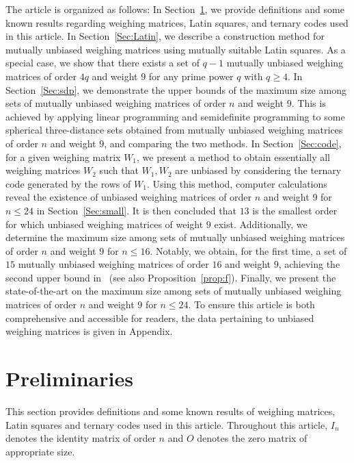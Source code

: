 \documentclass[12pt]{article}
\theoremstyle{remark}
\begin{document}
The article is organized as follows: 
In Section~\ref{Sec:2}, we provide definitions and some known results regarding weighing 
matrices, Latin squares, and ternary codes used in this article. 
In Section~\ref{Sec:Latin}, we describe a construction method for mutually unbiased 
weighing matrices using mutually suitable Latin squares. As a special case, we show that 
there exists a set of \( q - 1 \) mutually unbiased weighing matrices of order \( 4q \) and 
weight $9$ for any prime power \( q \) with \( q \ge 4 \). 
In Section~\ref{Sec:sdp}, we demonstrate the upper bounds of the maximum size among sets 
of mutually unbiased weighing matrices of order \( n \) and weight $9$. This is achieved by 
applying linear programming and 
semidefinite programming to some spherical three-distance sets obtained from mutually 
unbiased weighing matrices of order \( n \) and weight $9$, and comparing the two methods. 
In Section~\ref{Sec:code}, for a given weighing matrix \( W_1 \), we present a method to 
obtain essentially all weighing matrices \( W_2 \) such that \( W_1, W_2 \) are unbiased by 
considering the ternary code generated by the rows of \( W_1 \). Using this method, 
computer calculations reveal the existence of unbiased weighing matrices of order \( n \) and 
weight $9$ for \( n \le 24 \) in Section~\ref{Sec:small}. 
It is then concluded that $13$ is the smallest order for which unbiased weighing matrices of 
weight $9$ exist. Additionally, we determine the maximum size among sets of mutually 
unbiased weighing matrices of order \( n \) and weight $9$ for \( n \le 16 \). Notably, we 
obtain, for the first time, a set of $15$ mutually unbiased weighing matrices of order $16$ and 
weight $9$, achieving the second upper bound in~\cite[Corollary 10]{BKR} 
(see also Proposition~\ref{prop:f}). 
Finally, 
we present the state-of-the-art on the maximum size 
among sets of mutually unbiased weighing matrices of order \( n \) and weight $9$
for $ n \le 24$.
To ensure this article is both comprehensive and accessible for readers, 
the data pertaining to unbiased weighing matrices is given in Appendix.

\section{Preliminaries}\label{Sec:2}

This section provides definitions and some known results
of weighing matrices, Latin squares and ternary codes used in this article.
Throughout this article, $I_n$ denotes the identity matrix of order $n$ 
and $O$ denotes the zero matrix of appropriate size.
\end{document}
